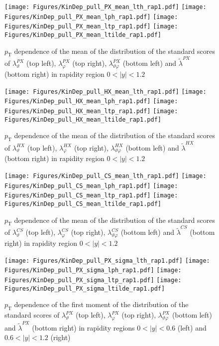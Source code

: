 \documentclass[12pt]{article}
\newcommand{\pT}{p_\mathrm{T}}
\newcommand{\absy}{\left |  y \right |}
\newcommand{\lamthCS}{\lambda^{\scriptscriptstyle CS}_\vartheta}
\newcommand{\lamphCS}{\lambda^{\scriptscriptstyle CS}_\varphi}
\newcommand{\lamthphCS}{\lambda^{\scriptscriptstyle CS}_{\vartheta \varphi}}
\newcommand{\lamtildeCS}{\tilde{\lambda}^{\scriptscriptstyle CS}}
\newcommand{\lamthHX}{\lambda^{\scriptscriptstyle HX}_\vartheta}
\newcommand{\lamphHX}{\lambda^{\scriptscriptstyle HX}_\varphi}
\newcommand{\lamthphHX}{\lambda^{\scriptscriptstyle HX}_{\vartheta \varphi}}
\newcommand{\lamtildeHX}{\tilde{\lambda}^{\scriptscriptstyle HX}}
\newcommand{\lamthPX}{\lambda^{\scriptscriptstyle PX}_\vartheta}
\newcommand{\lamphPX}{\lambda^{\scriptscriptstyle PX}_\varphi}
\newcommand{\lamthphPX}{\lambda^{\scriptscriptstyle PX}_{\vartheta \varphi}}
\newcommand{\lamtildePX}{\tilde{\lambda}^{\scriptscriptstyle PX}}
\begin{document}


\begin{figure}[htbp]
\centering
\texttt{[image: Figures/KinDep\_pull\_PX\_mean\_lth\_rap1.pdf]}
\texttt{[image: Figures/KinDep\_pull\_PX\_mean\_lph\_rap1.pdf]}
\texttt{[image: Figures/KinDep\_pull\_PX\_mean\_ltp\_rap1.pdf]}
\texttt{[image: Figures/KinDep\_pull\_PX\_mean\_ltilde\_rap1.pdf]}
\caption{$\pT$ dependence of the mean of the distribution of the standard scores
of $\lamthPX$ (top left), $\lamphPX$ (top right), $\lamthphPX$ (bottom left) and $\lamtildePX$ (bottom right) in rapidity
region $0<\absy<1.2$}
\end{figure}
\clearpage

\begin{figure}[htbp]
\centering
\texttt{[image: Figures/KinDep\_pull\_HX\_mean\_lth\_rap1.pdf]}
\texttt{[image: Figures/KinDep\_pull\_HX\_mean\_lph\_rap1.pdf]}
\texttt{[image: Figures/KinDep\_pull\_HX\_mean\_ltp\_rap1.pdf]}
\texttt{[image: Figures/KinDep\_pull\_HX\_mean\_ltilde\_rap1.pdf]}
\caption{$\pT$ dependence of the mean of the distribution of the standard scores
of $\lamthHX$ (top left), $\lamphHX$ (top right), $\lamthphHX$ (bottom left) and $\lamtildeHX$ (bottom right) in rapidity
region $0<\absy<1.2$}
\end{figure}
\clearpage

\begin{figure}[htbp]
\centering
\texttt{[image: Figures/KinDep\_pull\_CS\_mean\_lth\_rap1.pdf]}
\texttt{[image: Figures/KinDep\_pull\_CS\_mean\_lph\_rap1.pdf]}
\texttt{[image: Figures/KinDep\_pull\_CS\_mean\_ltp\_rap1.pdf]}
\texttt{[image: Figures/KinDep\_pull\_CS\_mean\_ltilde\_rap1.pdf]}
\caption{$\pT$ dependence of the mean of the distribution of the standard scores
of $\lamthCS$ (top left), $\lamphCS$ (top right), $\lamthphCS$ (bottom left) and $\lamtildeCS$ (bottom right) in rapidity
region $0<\absy<1.2$}
\end{figure}
\clearpage





\begin{figure}[htbp]
\centering
\texttt{[image: Figures/KinDep\_pull\_PX\_sigma\_lth\_rap1.pdf]}
\texttt{[image: Figures/KinDep\_pull\_PX\_sigma\_lph\_rap1.pdf]}
\texttt{[image: Figures/KinDep\_pull\_PX\_sigma\_ltp\_rap1.pdf]}
\texttt{[image: Figures/KinDep\_pull\_PX\_sigma\_ltilde\_rap1.pdf]}
\caption{$\pT$ dependence of the first moment of the distribution of the
standard scores of $\lamthPX$ (top left), $\lamphPX$ (top right), $\lamthphPX$ (bottom left) and $\lamtildePX$ (bottom right)
in rapidity regions $0<\absy<0.6$ (left) and $0.6<\absy<1.2$ (right)}
\end{figure}
\clearpage
\end{document}
